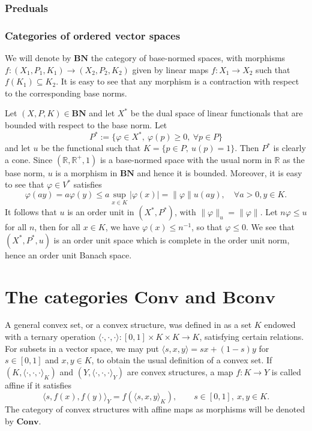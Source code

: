 \documentclass[12pt]{article}
\theoremstyle{remark}
\newcommand{\<}{\langle}
\def\>{\rangle}
\newcommand{\ct}[1]{\mathbf{#1}}
\begin{document}
\subsubsection*{Preduals}


\subsubsection*{Categories of ordered vector spaces}
We will denote 
by $\ct{BN}$ the category of base-normed spaces, with morphisms $f: (X_1,P_1,K_1)\to (X_2,P_2,K_2)$ given by linear maps $f:X_1\to X_2$ such that $f(K_1)\subseteq K_2$. It is easy to see that any morphism is a contraction with respect to the corresponding base norms.

Let $(X,P,K)\in \ct{BN}$ and let $X^*$ be the dual space of linear functionals that are bounded with respect to the base norm. Let 
\[
P^*:=\{ \varphi\in X^*,\ \varphi(p)\ge 0,\ \forall p\in P\}
\]
and let $u$ be the functional such that $K=\{p\in P,\ u(p)=1\}$. Then $P^*$ is clearly a  cone.
Since $(\mathbb R, \mathbb R^+, 1)$ is a base-normed space with the usual norm in $\mathbb R$ as the base norm, $u$ is a morphism in $\ct{BN}$ and hence it is bounded. Moreover, it is easy to see that  $\varphi\in V^*$ satisfies
\[
\varphi(ay)=a\varphi(y)\le a\sup_{x\in K}|\varphi(x)|=\|\varphi\|u(ay),\quad \forall  a>0, y\in K.
\]
It follows that $u$ is an order unit in $(X^*,P^*)$, with $\|\varphi\|_u=\|\varphi\|$. Let $n\varphi\le u$ for all $n$, then for all $x\in K$, we have $\varphi(x)\le n^{-1}$, so that $\varphi\le 0$. We see that $(X^*,P^*,u)$ is an order unit space which is complete in the order unit norm, hence an order unit Banach space.


\section{The categories $\ct{Conv}$ and $\ct{Bconv}$}


A general convex set, or a convex structure, was defined in \cite{gudder} as a set $K$ endowed with a ternary operation $\<\cdot,\cdot,\cdot\>: [0,1]\times K\times K\to K$,
 satisfying certain relations. For subsets in a vector space, we may put $\<s,x,y\>=sx+(1-s)y$ for $s\in [0,1]$ and $x,y\in K$, to obtain the usual definition of a convex set.  If $(K,\<\cdot,\cdot,\cdot\>_K)$ and $(Y,\<\cdot,\cdot,\cdot\>_Y)$ are convex structures, a map $f:K\to Y$ is called affine if it satisfies
\[
\<s,f(x),f(y)\>_Y=f(\<s,x,y\>_K),\qquad s\in [0,1],\ x,y\in K.
\]
The category of convex structures with affine maps as morphisms will be denoted by $\ct{Conv}$. 
\end{document}
